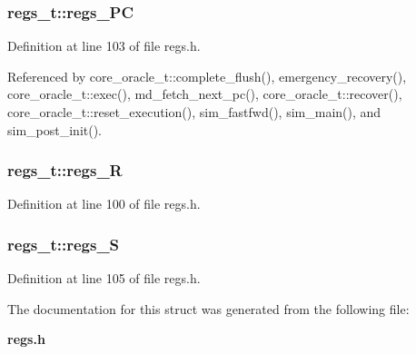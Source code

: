 \subsubsection[{regs\_\-PC}]{ {\bf regs\_\-t::regs\_\-PC}}\label{structregs__t_c6889ccce9099e2fbf701f7fb78cedf1}




Definition at line 103 of file regs.h.

Referenced by core\_\-oracle\_\-t::complete\_\-flush(), emergency\_\-recovery(), core\_\-oracle\_\-t::exec(), md\_\-fetch\_\-next\_\-pc(), core\_\-oracle\_\-t::recover(), core\_\-oracle\_\-t::reset\_\-execution(), sim\_\-fastfwd(), sim\_\-main(), and sim\_\-post\_\-init().
\subsubsection[{regs\_\-R}]{ {\bf regs\_\-t::regs\_\-R}}\label{structregs__t_09f6c8b44a3f08bc13e36c7b9a11a642}




Definition at line 100 of file regs.h.
\subsubsection[{regs\_\-S}]{ {\bf regs\_\-t::regs\_\-S}}\label{structregs__t_c50740591e2ad9de1d2d5b124d78f67b}




Definition at line 105 of file regs.h.

The documentation for this struct was generated from the following file:\begin{CompactItemize}
\item 
{\bf regs.h}\end{CompactItemize}
